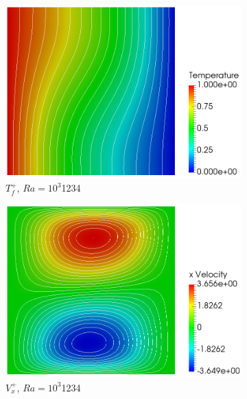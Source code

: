 \begin{figure}[!h]
\centering
\begin{subfigure}{0.32\textwidth}
  \centering
  \includegraphics[width=\linewidth]{figs/Ra3_t.png}
  \caption{\(T_f^+\), \(Ra=10^3\)\color{white}1234}
    \vspace*{0.5em}
\end{subfigure}
\begin{subfigure}{0.32\textwidth}
  \centering
  \includegraphics[width=\linewidth]{figs/Ra3_u.png}
  \caption{\(V_x^+\), \(Ra=10^3\)\color{white}1234}
    \vspace*{0.5em}
\end{subfigure}
\begin{subfigure}{0.32\textwidth}
  \centering

\end{subfigure}
\end{figure}
